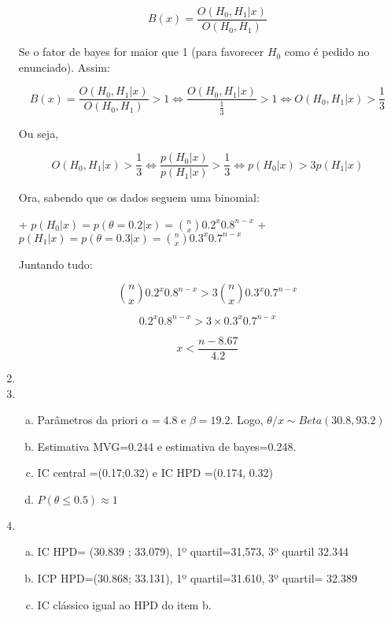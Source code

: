 \documentclass[10pt,brazil,addpoints]{exam}
\begin{document}
\begin{enumerate}[1.]
$$B(x) = \frac{O(H_0,H_1|x)}{O(H_0,H_1)}$$

Se o fator de bayes for maior que 1 (para favorecer $H_0$ como é pedido no enunciado). Assim:

$$B(x) = \frac{O(H_0,H_1|x)}{O(H_0,H_1)} \gt 1 \iff \frac{O(H_0,H_1|x)}{\frac{1}{3}} \gt 1 \iff O(H_0,H_1|x) \gt \frac{1}{3}$$

Ou seja,

$$O(H_0,H_1|x) \gt \frac{1}{3} \iff \frac{p(H_0|x)}{p(H_1|x)} \gt \frac{1}{3}\iff p(H_0|x) \gt 3p(H_1|x)$$

Ora, sabendo que os dados seguem uma binomial:

+ $p(H_0|x) = p(\theta = 0.2|x) = \binom n x 0.2^x 0.8^{n-x}$
+ $p(H_1|x) = p(\theta = 0.3|x) = \binom n x 0.3^x 0.7^{n-x}$

Juntando tudo:

$$\binom n x 0.2^x 0.8^{n-x} \gt 3 \binom n x 0.3^x 0.7^{n-x}$$

$$0.2^x 0.8^{n-x} \gt 3 \times 0.3^x 0.7^{n-x}$$

$$x \lt \frac{n - 8.67}{4.2}$$

\item

\item 

\begin{enumerate}[a)]
\item Parâmetros da priori $\alpha=4.8$ e 
$\beta=19.2 $. Logo, $\theta/x\sim Beta(30.8, 93.2)$

\item Estimativa MVG=0.244 e estimativa de bayes=0.248.

\item IC central =(0.17;0.32) e IC HPD =(0.174, 0.32)

\item $P(\theta \leq 0.5) \approx 1$
\end{enumerate}

\item 
\begin{enumerate}[a)]

\item IC HPD= (30.839 ; 33.079), 1º quartil=31,573, 3º quartil 32.344

\item ICP HPD=(30.868; 33.131), 1º quartil=31.610, 3º quartil= 32.389

\item IC clássico igual ao HPD do item b.



\end{enumerate}
\end{enumerate}
\end{document}
